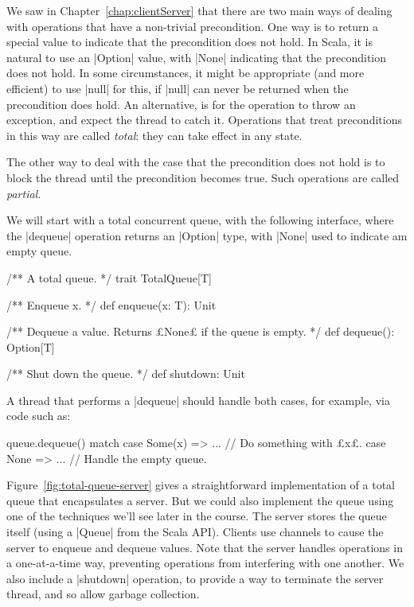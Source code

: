 We saw in Chapter~\ref{chap:clientServer} that there are two main ways of
dealing with operations that have a non-trivial precondition.  One way is to
return a special value to indicate that the precondition does not hold.  In
Scala, it is natural to use an |Option| value, with |None| indicating that the
precondition does not hold.  In some circumstances, it might be appropriate
(and more efficient) to use |null| for this, if |null| can never be returned
when the precondition does hold.  An alternative, is for the operation to
throw an exception, and expect the thread to catch it.  Operations that treat
preconditions in this way are called \emph{total}: they can take effect in any
state.

The other way to deal with the case that the precondition does not hold is to
block the thread until the precondition becomes true.  Such operations are
called \emph{partial}.

We will start with a total concurrent queue, with the following interface,
where the |dequeue| operation returns an |Option| type, with |None| used to
indicate am empty queue. 
%
\begin{mysamepage}
\begin{scala}
/** A total queue. */
trait TotalQueue[T]{
  /** Enqueue x. */
  def enqueue(x: T): Unit

  /** Dequeue a value.  Returns £None£ if the queue is empty. */
  def dequeue(): Option[T]

  /** Shut down the queue. */
  def shutdown: Unit
}
\end{scala}
\end{mysamepage}

A thread that performs a |dequeue| should handle both cases, for example, via
code such as:
\begin{scala}
  queue.dequeue() match{
    case Some(x) => ... // Do something with £x£.
    case None => ... // Handle the empty queue.
  }
\end{scala}

Figure~\ref{fig:total-queue-server} gives a straightforward implementation of
a total queue that encapsulates a server.  But we could also implement the
queue using one of the techniques we'll see later in the course.  The server
stores the queue itself (using a |Queue| from the Scala API).  Clients use
channels to cause the server to enqueue and dequeue values.  Note that the
server handles operations in a one-at-a-time way, preventing operations from
interfering with one another.  We also include a |shutdown| operation, to
provide a way to terminate the server thread, and so allow garbage collection.

